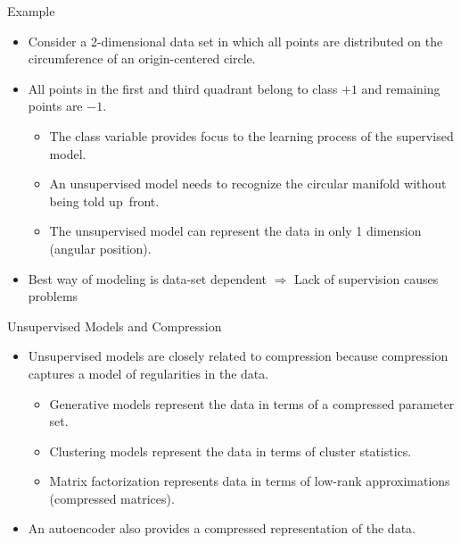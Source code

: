 \begin{frame}{Example}
\begin{itemize}
\item Consider a 2-dimensional data set in which all points are
 distributed on the circumference of an origin-centered circle.
\item All points in the first and third quadrant belong to class
$+1$ and remaining points are $-1$.
\begin{itemize}
\item The class variable provides focus to the learning process of the supervised model.
\item An unsupervised model needs  to recognize the
circular manifold without being told up~front.
\item The unsupervised model can represent the data in only 1
dimension (angular position).
\end{itemize}
\item Best way of modeling is data-set dependent $\Rightarrow$ Lack
of supervision causes problems
\end{itemize}
\end{frame}


\begin{frame}{Unsupervised Models and Compression}
\begin{itemize}
\item Unsupervised models are closely related to compression because compression
captures a model of regularities in the data.
\begin{itemize}
\item Generative models represent the data in terms of a compressed
parameter set.
\item Clustering models represent the data in terms of cluster
statistics. \item Matrix factorization represents data in terms of
low-rank approximations (compressed matrices).
\end{itemize}
\item An autoencoder also provides a compressed representation of
the data.
\end{itemize}
\end{frame}


